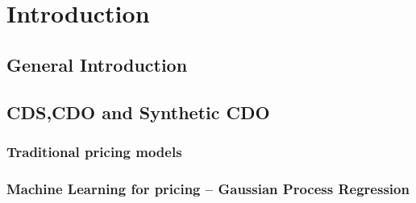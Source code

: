 \documentclass[[11pt,twoside,a4paper]{article}
\theoremstyle{definition}
\newtheorem{remark}[theorem]{Remark}
\numberwithin{equation}{section}
\begin{document}
%
%

\setcounter{tocdepth}{4}

\tableofcontents %
 
\newpage %

\fancyhead{}
\fancyfoot{}
\pagestyle{fancy} 
\fancyhead[RO,LE]{\sffamily\small \thepage}
\fancyhead[LO,RE]{\sffamily\small \nouppercase{\rightmark}}
\renewcommand{\headrulewidth}{0.35pt}
\renewcommand{\footrulewidth}{0.0pt}





\section{Introduction}
\subsection{General Introduction}

\subsection{CDS,CDO and Synthetic CDO}

\subsubsection{Traditional pricing models}

\subsubsection{Machine Learning for pricing -- Gaussian Process Regression}

\newpage
\end{document}
